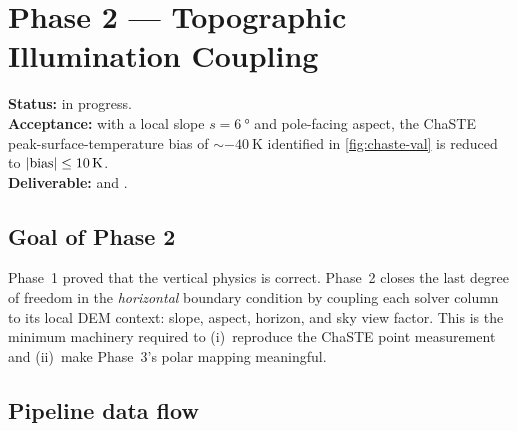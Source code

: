 \chapter{Phase 2 --- Topographic Illumination Coupling}
\label{chap:phase2}

\begin{milestone}
\textbf{Status:} in progress.\\
\textbf{Acceptance:} with a local slope $s=\SI{6}{\degree}$ and
pole-facing aspect, the ChaSTE peak-surface-temperature bias of
$\sim\SI{-40}{\kelvin}$ identified in \cref{fig:chaste-val} is reduced
to $|{\rm bias}|\le\SI{10}{\kelvin}$.\\
\textbf{Deliverable:} 
and .
\end{milestone}

\section{Goal of Phase 2}

Phase~1 proved that the vertical physics is correct.  Phase~2 closes
the last degree of freedom in the \emph{horizontal} boundary condition
by coupling each solver column to its local DEM context: slope,
aspect, horizon, and sky view factor.  This is the minimum machinery
required to (i)~reproduce the ChaSTE point measurement and (ii)~make
Phase~3's polar mapping meaningful.

\section{Pipeline data flow}

